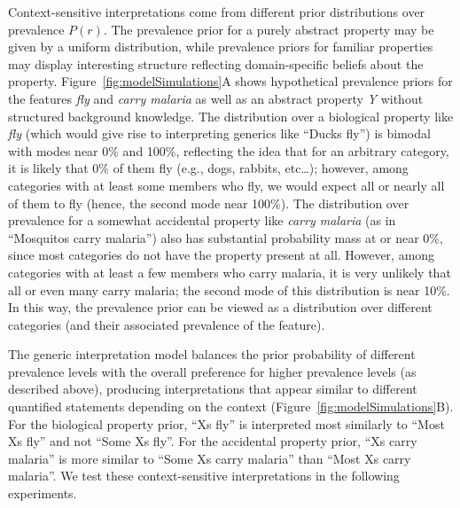 \documentclass[floatsintext,man]{apa6}
\theoremstyle{definition}
\theoremstyle{definition}
\theoremstyle{definition}
\theoremstyle{remark}
\begin{document}
Context-sensitive interpretations come from different prior
distributions over prevalence \(P(r)\). The prevalence prior for a
purely abstract property may be given by a uniform distribution, while
prevalence priors for familiar properties may display interesting
structure reflecting domain-specific beliefs about the property.
Figure~\ref{fig:modelSimulations}A shows hypothetical prevalence priors
for the features \emph{fly} and \emph{carry malaria} as well as an
abstract property \emph{Y} without structured background knowledge. The
distribution over a biological property like \emph{fly} (which would
give rise to interpreting generics like \enquote{Ducks fly}) is bimodal
with modes near 0\% and 100\%, reflecting the idea that for an arbitrary
category, it is likely that 0\% of them fly (e.g., dogs, rabbits,
etc\ldots{}); however, among categories with at least some members who
fly, we would expect all or nearly all of them to fly (hence, the second
mode near 100\%). The distribution over prevalence for a somewhat
accidental property like \emph{carry malaria} (as in \enquote{Mosquitos
carry malaria}) also has substantial probability mass at or near 0\%,
since most categories do not have the property present at all. However,
among categories with at least a few members who carry malaria, it is
very unlikely that all or even many carry malaria; the second mode of
this distribution is near 10\%. In this way, the prevalence prior can be
viewed as a distribution over different categories (and their associated
prevalence of the feature).

The generic interpretation model balances the prior probability of
different prevalence levels with the overall preference for higher
prevalence levels (as described above), producing interpretations that
appear similar to different quantified statements depending on the
context (Figure~\ref{fig:modelSimulations}B). For the biological
property prior, \enquote{Xs fly} is interpreted most similarly to
\enquote{Most Xs fly} and not \enquote{Some Xs fly}. For the accidental
property prior, \enquote{Xs carry malaria} is more similar to
\enquote{Some Xs carry malaria} than \enquote{Most Xs carry malaria}. We
test these context-sensitive interpretations in the following
experiments.
\end{document}
